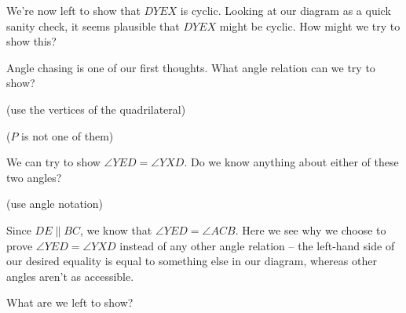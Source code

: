 We're now left to show that $DYEX$ is cyclic. Looking at our diagram as a quick sanity check, it seems plausible that $DYEX$ might be cyclic. How might we try to show this?




Angle chasing is one of our first thoughts. What angle relation can we try to show?

(use the vertices of the quadrilateral)

($P$ is not one of them)


We can try to show $\angle YED = \angle YXD$. Do we know anything about either of these two angles?

(use angle notation)





Since $DE\parallel BC$, we know that $\angle YED = \angle ACB$. Here we see why we choose to prove $\angle YED = \angle YXD$ instead of any other angle relation -- the left-hand side of our desired equality is equal to something else in our diagram, whereas other angles aren't as accessible.

What are we left to show?



